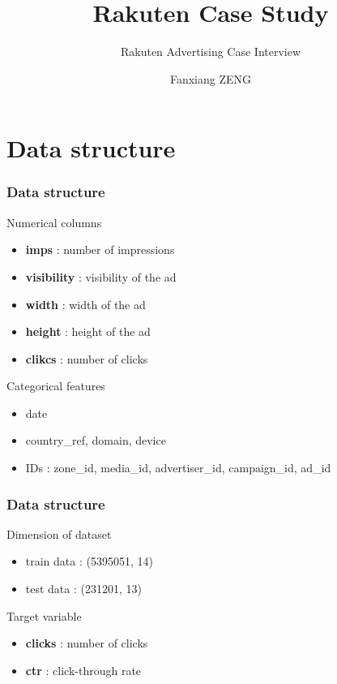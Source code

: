 \documentclass[compress,xcolor=table]{beamer}
\title{Rakuten Case Study}
\subtitle{Rakuten Advertising Case Interview} %
\date{\formatdate{25}{03}{2024}}
\author{Fanxiang ZENG}
\begin{document}
\begin{frame}[plain]
	\titlepage
	\setcounter{framenumber}{0}
\end{frame}

\section{Data structure}
\begin{frame}
	\frametitle{Data structure}

	\begin{block}{Numerical columns}
		\begin{itemize}
			\item  \textbf{imps} : number of impressions
			\item \textbf{visibility} : visibility of the ad
			\item \textbf{width} : width of the ad
			\item \textbf{height} : height of the ad
			\item \textbf{clikcs} : number of clicks
		\end{itemize}
	\end{block}

	\begin{block}{Categorical features}
		\begin{itemize}
			\item date 
			\item country\_ref, domain, device
			\item IDs : zone\_id, media\_id, advertiser\_id, campaign\_id, ad\_id
		\end{itemize}
	\end{block}

\end{frame}

\begin{frame}
	\frametitle{Data structure}
	\begin{block}{Dimension of dataset}
		\begin{itemize}
			\item  train data : (5395051, 14)
			\item  test data : (231201, 13)
		\end{itemize}
	\end{block}
	\begin{block}{Target variable}
		\begin{itemize}
			\item  \textbf{clicks} : number of clicks
			\item  \textbf{ctr} : click-through rate
		\end{itemize}
		
	\end{block}


\end{frame}
\end{document}

